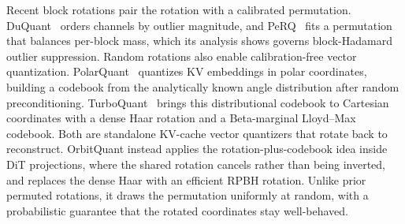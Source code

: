 Recent block rotations pair the rotation with a calibrated permutation. DuQuant~\cite{lin2024duquant} orders channels by outlier magnitude, and PeRQ~\cite{sanjeet2026pushing} fits a permutation that balances per-block mass, which its analysis shows governs block-Hadamard outlier suppression. Random rotations also enable calibration-free vector quantization. PolarQuant~\cite{han2026polarquant} quantizes KV embeddings in polar coordinates, building a codebook from the analytically known angle distribution after random preconditioning. TurboQuant~\cite{zandieh2025turboquant} brings this distributional codebook to Cartesian coordinates with a dense Haar rotation and a Beta-marginal Lloyd--Max codebook. Both are standalone KV-cache vector quantizers that rotate back to reconstruct. OrbitQuant instead applies the rotation-plus-codebook idea inside DiT projections, where the shared rotation cancels rather than being inverted, and replaces the dense Haar with an efficient RPBH rotation. Unlike prior permuted rotations, it draws the permutation uniformly at random, with a probabilistic guarantee that the rotated coordinates stay well-behaved.


